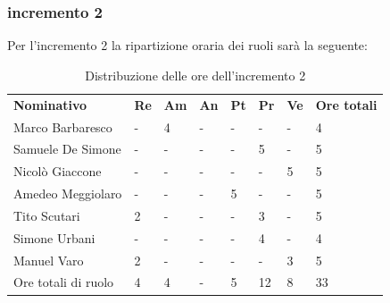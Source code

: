 \subsubsection{incremento 2}
Per l'incremento 2 la ripartizione oraria dei ruoli sarà la seguente:
\begin{center}
    \begin{table}[ht!]
        \centering
        \caption{Distribuzione delle ore dell'incremento 2}
        \vspace{5px}
        \renewcommand{\arraystretch}{1.8}
        \begin{tabular}{p{100px} p{20px} p{20px} p{20px} p{20px} p{20px} p{20px} p{50px} }
            \rowcolor{logo!70} \textbf{Nominativo} & \textbf{Re} & \textbf{Am} & \textbf{An} & \textbf{Pt} & \textbf{Pr} & \textbf{Ve} & \textbf{Ore totali} \\
            Marco Barbaresco                       & -           & 4           & -           & -           & -           & -           & 4                   \\
            Samuele De Simone                      & -           & -           & -           & -           & 5           & -           & 5                   \\
            Nicolò Giaccone                        & -           & -           & -           & -           & -           & 5           & 5                   \\
            Amedeo Meggiolaro                      & -           & -           & -           & 5           & -           & -           & 5                   \\
            Tito Scutari                           & 2           & -           & -           & -           & 3           & -           & 5                   \\
            Simone Urbani                          & -           & -           & -           & -           & 4           & -           & 4                   \\
            Manuel Varo                            & 2           & -           & -           & -           & -           & 3           & 5                   \\
            Ore totali di ruolo                    & 4           & 4           & -           & 5           & 12          & 8           & 33                  \\
        \end{tabular}
    \end{table}
\end{center}
